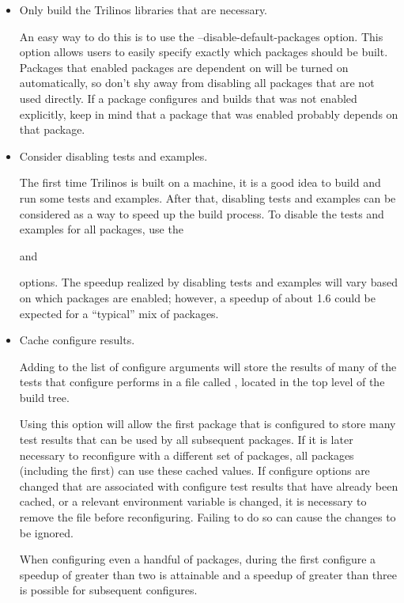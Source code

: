 \begin{itemize}
\item Only build the Trilinos libraries that are necessary.

An easy way to do this is to use the --disable-default-packages option.  
This option allows users to easily specify exactly which packages should be 
built.  Packages that enabled 
packages are dependent on will be turned on automatically, so
don't shy away from disabling all packages that are not used directly.  
If a package configures and builds that was not enabled explicitly, 
keep in mind that a package that was enabled probably depends on that package.

\item Consider disabling tests and examples.

The first time Trilinos is built on a machine, it is a good idea to build 
and run some tests and examples.  After that, disabling tests and examples
can be considered as a way to speed up the build process.  To disable 
the tests and examples for all packages, use the 

and


options.  The speedup realized by disabling tests and examples will vary based 
on which packages are enabled; however, a speedup of about 1.6 could be 
expected for a ``typical'' mix of packages.

\item Cache configure results.

Adding 
to the list of configure arguments will store the results of many of the tests
that configure performs in a file called , 
located in the top level of the build tree.

Using this option will allow the first package that is configured to store 
many test results that can be used by all subsequent packages.  If it is 
later necessary to reconfigure with a different set of packages, all packages
(including the first) can use these cached values.  If configure options are
changed that are associated with configure test results that have already 
been cached, or a relevant environment variable is changed, it is necessary 
to remove the
 file before reconfiguring.  Failing to do so
can cause the changes to be ignored.  

When configuring even a handful of 
packages, during the first configure a speedup of greater
than two is attainable and a speedup of greater than three is possible for 
subsequent configures.


\end{itemize}
